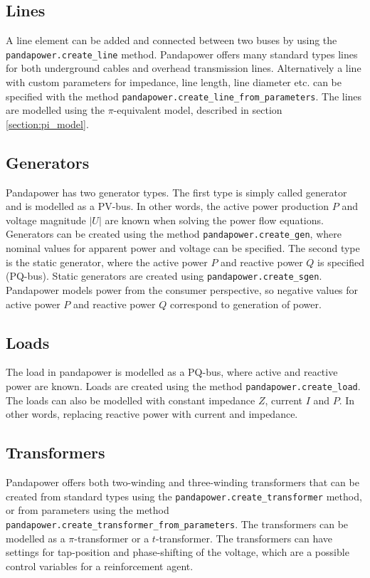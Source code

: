 \documentclass[class=book, crop=false, 11pt]{standalone}
\begin{document}
\subsection*{Lines}
A line element can be added and connected between two buses by using the \texttt{pandapower.create\_line} method. Pandapower offers many standard types lines for both underground cables and overhead transmission lines. Alternatively a line with custom parameters for impedance, line length, line diameter etc. can be specified with the method \texttt{pandapower.create\_line\_from\_parameters}. The lines are modelled using the $\pi$-equivalent model, described in section \ref{section:pi_model}.

\subsection*{Generators}
Pandapower has two generator types. The first type is simply called generator and is modelled as a PV-bus. In other words, the active power production $P$ and voltage magnitude $|U|$ are known when solving the power flow equations. Generators can be created using the method \texttt{pandapower.create\_gen}, where nominal values for apparent power and voltage can be specified. The second type is the static generator, where the active power $P$ and reactive power $Q$ is specified (PQ-bus). Static generators are created using \texttt{pandapower.create\_sgen}. Pandapower models power from the consumer perspective, so negative values for active power $P$ and reactive power $Q$ correspond to generation of power.

\subsection*{Loads}
The load in pandapower is modelled as a PQ-bus, where active and reactive power are known. Loads are created using the method \texttt{pandapower.create\_load}. The loads can also be modelled with constant impedance $Z$, current $I$ and $P$. In other words, replacing reactive power with current and impedance.

\subsection*{Transformers}
Pandapower offers both two-winding and three-winding transformers that can be created from standard types using the \texttt{pandapower.create\_transformer} method, or from parameters using the method
\texttt{pandapower.create\_transformer\_from\_parameters}. The transformers can be modelled as a $\pi$-transformer or a $t$-transformer. The transformers can have settings for tap-position and phase-shifting of the voltage, which are a possible control variables for a reinforcement agent.  
\end{document}

